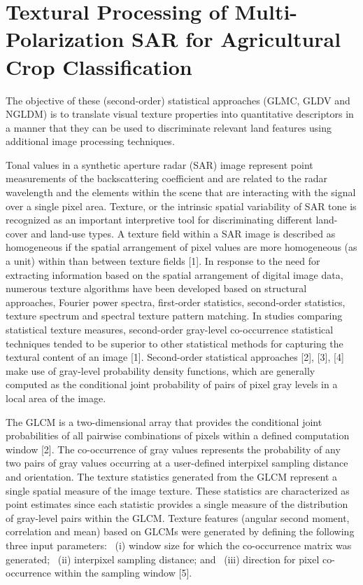 \documentclass[paper=a4, fontsize=11pt]{scrartcl}
\begin{document}
\newpage

\section*{\textcolor{VioletRed4}{Textural Processing of Multi-Polarization SAR for Agricultural Crop Classification}}

The objective of these (second-order) statistical approaches (GLMC, GLDV and NGLDM) is to translate visual texture properties into quantitative descriptors in a manner that they can be used to discriminate relevant land features using additional image processing  techniques.

Tonal values in a synthetic aperture radar (SAR) image represent point measurements of the backscattering coefficient and are related to the radar wavelength and the elements within the scene that are interacting with the signal over a single pixel area. 
Texture, or the intrinsic spatial variability of SAR tone is recognized as an important interpretive tool for discriminating different land-cover and land-use types. 
A texture field within a SAR image is described as homogeneous if the spatial arrangement of pixel values are more homogeneous (as a unit) within than between texture fields [1]. 
In response to the need for extracting information based on the spatial arrangement of digital image data, numerous texture algorithms have been  developed based on structural approaches, Fourier power spectra, first-order statistics, second-order statistics, texture spectrum and spectral texture pattern matching. 
In studies comparing statistical texture measures, second-order gray-level co-occurrence statistical techniques tended to be superior to other statistical methods for capturing the textural content of an image [1].
Second-order statistical approaches [2], [3], [4] make use of gray-level probability density functions, which are generally computed as the conditional joint probability of pairs of pixel gray levels in a local area  of the image.

The GLCM is a two-dimensional array that provides the conditional joint probabilities of all pairwise combinations of pixels within a defined computation window [2].
The co-occurrence of gray values represents the probability of any two pairs of gray values occurring at a user-defined interpixel sampling distance and orientation. 
The texture statistics generated from the GLCM represent a single spatial measure of the image texture. 
These statistics are characterized as point estimates since each statistic provides a single measure of the distribution of gray-level pairs within the GLCM. 
Texture features (angular second moment, correlation and mean) based on GLCMs were generated by defining the following three input parameters: 
~(i) window size for which the co-occurrence matrix was generated; 
~(ii) interpixel sampling distance; and 
~(iii) direction for pixel co-occurrence within the sampling window [5].
\end{document}
